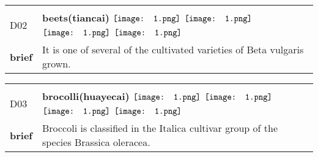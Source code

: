 \documentclass[UTF8]{article}
\begin{document}
            \begin{tabularx}{\textwidth}{p{1.5cm}X}
            \arrayrulecolor{myBlue}
        	\hline\\
            \small{D02}&
            \large{\bfseries{beets(tiancai)}}\hfill
                                                            \phantom{$\vcenter{\hbox{\texttt{[image: 1.png]}}}$}
                                                                \phantom{$\vcenter{\hbox{\texttt{[image: 1.png]}}}$}
                                                                $\vcenter{\hbox{\texttt{[image: 1.png]}}}$
                                                                $\vcenter{\hbox{\texttt{[image: 1.png]}}}$
                                                                \phantom{$\vcenter{\hbox{\texttt{[image: 1.png]}}}$}
                                                                $\vcenter{\hbox{\texttt{[image: 1.png]}}}$
                                                                $\vcenter{\hbox{\texttt{[image: 1.png]}}}$
                                        \\[10pt]
            \large{\bfseries{brief}}&\noindent\parbox[c]{\hsize}{It is one of several of the cultivated varieties of Beta vulgaris grown. } \\[5pt]
            \hline\\[-10pt]
        \end{tabularx}
            \begin{tabularx}{\textwidth}{p{1.5cm}X}
            \arrayrulecolor{myBlue}
        	\hline\\
            \small{D03}&
            \large{\bfseries{brocolli(huayecai)}}\hfill
                                                            \phantom{$\vcenter{\hbox{\texttt{[image: 1.png]}}}$}
                                                                \phantom{$\vcenter{\hbox{\texttt{[image: 1.png]}}}$}
                                                                $\vcenter{\hbox{\texttt{[image: 1.png]}}}$
                                                                $\vcenter{\hbox{\texttt{[image: 1.png]}}}$
                                                                \phantom{$\vcenter{\hbox{\texttt{[image: 1.png]}}}$}
                                                                $\vcenter{\hbox{\texttt{[image: 1.png]}}}$
                                                                $\vcenter{\hbox{\texttt{[image: 1.png]}}}$
                                        \\[10pt]
            \large{\bfseries{brief}}&\noindent\parbox[c]{\hsize}{Broccoli is classified in the Italica cultivar group of the species Brassica oleracea.} \\[5pt]
            \hline\\[-10pt]
        \end{tabularx}
\end{document}
